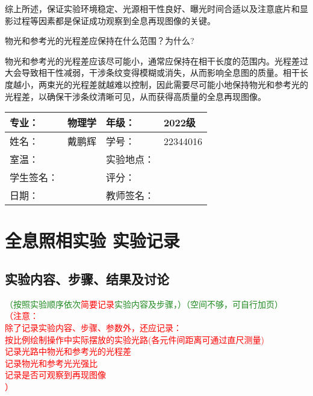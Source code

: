 \documentclass[dvipsnames, svgnames,a4paper,11pt]{article}
\begin{document}
		综上所述，保证实验环境稳定、光源相干性良好、曝光时间合适以及注意底片和显影过程等因素都是保证成功观察到全息再现图像的关键。
		
		
		
		

	\begin{question}
		物光和参考光的光程差应保持在什么范围？为什么?
	\end{question}
		
	物光和参考光的光程差应该尽可能小，通常应保持在相干长度的范围内。光程差过大会导致相干性减弱，干涉条纹变得模糊或消失，从而影响全息图的质量。相干长度越小，两束光的光程差就越难以控制，因此需要尽可能小地保持物光和参考光的光程差，以确保干涉条纹清晰可见，从而获得高质量的全息再现图像。

\clearpage
\begin{table}
	\renewcommand\arraystretch{1.7}
	\centering
	\begin{tabularx}{\textwidth}{|X|X|X|X|}
	\hline
	专业：& 物理学 &年级：& 2022级 \\
	\hline
	姓名：& 戴鹏辉 & 学号：& 22344016 \\
	\hline
	室温：&  & 实验地点： &  \\
	\hline
	学生签名：& & 评分： &\\
	\hline
	日期：&  & 教师签名：&\\
	\hline
	\end{tabularx}
\end{table}

\section{全息照相实验 \quad\heiti 实验记录}
\subsection{实验内容、步骤、结果及讨论}\textcolor{ForestGreen}{（按照实验顺序依次}\textcolor{red}{简要记录}\textcolor{ForestGreen}{实验内容及步骤，）（空间不够，可自行加页）}\\
\textcolor{red}{
（注意： \\
除了记录实验内容、步骤、参数外，还应记录：\\
按比例绘制操作中实际摆放的实验光路(各元件间距离可通过直尺测量)\\
记录光路中物光和参考光的光程差\\
记录物光和参考光光强比\\
记录是否可观察到再现图像\\
）
}
\end{document}
